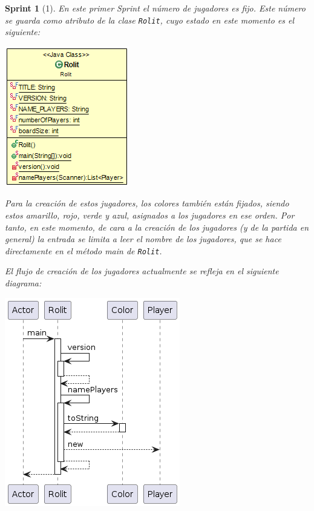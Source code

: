 \documentclass[12pt,a4paper,openright]{book}
\theoremstyle{break}
\newtheorem*{sprint}{Sprint}
\begin{document}
\begin{sprint}[1]
En este primer Sprint el número de jugadores es fijo. Este número se guarda como atributo de la clase \texttt{Rolit}, cuyo estado en este momento es el siguiente:

\begin{center}
\includegraphics[scale=0.85]{Rolit-sprint1.png} 
\end{center}

Para la creación de estos jugadores, los colores también están fijados, siendo estos amarillo, rojo, verde y azul, asignados a los jugadores en ese orden. Por tanto, en este momento, de cara a la creación de los jugadores (y de la partida en general) la entrada se limita a leer el nombre de los jugadores, que se hace directamente en el método main de \texttt{Rolit}.

El flujo de creación de los jugadores actualmente se refleja en el siguiente diagrama:

\begin{center}
\includegraphics[scale=0.85]{Rolit.main()-sprint1.png} 
\end{center}

\end{sprint}
\end{document}
